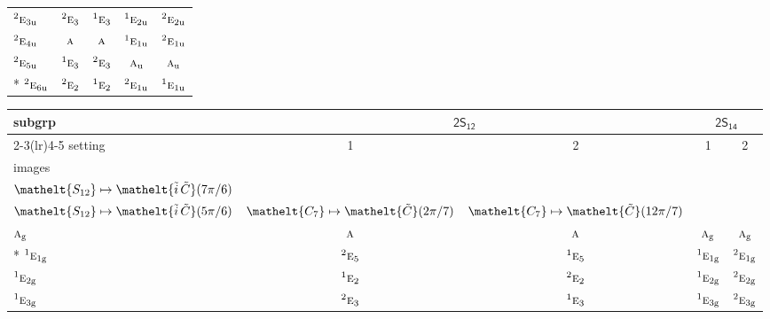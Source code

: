 \documentclass[10pt,a4paper]{article}
\numberwithin{equation}{section}
\newcommand{\eltfont}[1]{{\let\sigma\eltsigma\mathelt{#1}}}
\newcommand{\grp}[1]{\mathsf{#1}}
\newcommand{\irr}[1]{\text{\normalfont\scshape #1}}
\newcommand{\conjpair}[1]{{}^{#1}}
\newcommand{\cls}[1]{\eltfont{#1}}
\newcommand{\elt}[1]{\eltfont{#1}}
\newcommand{\ptag}[1]{\mathrm{#1}}
\newcommand{\lift}[1]{\tilde{#1}}
\begin{document}
{\begin{longtable}{@{}lcccc@{}}
$\conjpair{2}\irr{e}_{3\ptag{u}}$ & $\conjpair{2}\irr{e}_{3}$ & $\conjpair{1}\irr{e}_{3}$ & $\conjpair{1}\irr{e}_{2\ptag{u}}$ & $\conjpair{2}\irr{e}_{2\ptag{u}}$\\
$\conjpair{2}\irr{e}_{4\ptag{u}}$ & $\irr{a}$ & $\irr{a}$ & $\conjpair{1}\irr{e}_{1\ptag{u}}$ & $\conjpair{2}\irr{e}_{1\ptag{u}}$\\
$\conjpair{2}\irr{e}_{5\ptag{u}}$ & $\conjpair{1}\irr{e}_{3}$ & $\conjpair{2}\irr{e}_{3}$ & $\irr{a}_{\ptag{u}}$ & $\irr{a}_{\ptag{u}}$\\*
$\conjpair{2}\irr{e}_{6\ptag{u}}$ & $\conjpair{2}\irr{e}_{2}$ & $\conjpair{1}\irr{e}_{2}$ & $\conjpair{2}\irr{e}_{1\ptag{u}}$ & $\conjpair{1}\irr{e}_{1\ptag{u}}$\\
\bottomrule\end{longtable}}
{\small\begin{longtable}{@{}lcccc@{}}\toprule
subgrp & \multicolumn{2}{c}{\href{2S12.pdf}{$\grp{2S_{12}}$}} & \multicolumn{2}{c}{\href{2S14.pdf}{$\grp{2S_{14}}$}}\\\cmidrule(lr){2-3}\cmidrule(lr){4-5}
setting & 1 & 2 & 1 & 2\\
images & {\scriptsize\begin{tabular}[t]{@{}c@{}}$\cls{C_{6}} \mapsto \elt{\lift{C}}(\pi/3)$\\$\cls{S_{12}} \mapsto \elt{\lift{i}\,\lift{C}}(7\pi/6)$\end{tabular}} & {\scriptsize\begin{tabular}[t]{@{}c@{}}$\cls{C_{6}} \mapsto \elt{\lift{C}}(5\pi/3)$\\$\cls{S_{12}} \mapsto \elt{\lift{i}\,\lift{C}}(5\pi/6)$\end{tabular}} & {\scriptsize $\cls{C_{7}} \mapsto \elt{\lift{C}}(2\pi/7)$} & {\scriptsize $\cls{C_{7}} \mapsto \elt{\lift{C}}(12\pi/7)$}\\\midrule\endhead
\bottomrule\endfoot\endlastfoot
$\irr{a}_{\ptag{g}}$ & $\irr{a}$ & $\irr{a}$ & $\irr{a}_{\ptag{g}}$ & $\irr{a}_{\ptag{g}}$\\*
$\conjpair{1}\irr{e}_{1\ptag{g}}$ & $\conjpair{2}\irr{e}_{5}$ & $\conjpair{1}\irr{e}_{5}$ & $\conjpair{1}\irr{e}_{1\ptag{g}}$ & $\conjpair{2}\irr{e}_{1\ptag{g}}$\\
$\conjpair{1}\irr{e}_{2\ptag{g}}$ & $\conjpair{1}\irr{e}_{2}$ & $\conjpair{2}\irr{e}_{2}$ & $\conjpair{1}\irr{e}_{2\ptag{g}}$ & $\conjpair{2}\irr{e}_{2\ptag{g}}$\\
$\conjpair{1}\irr{e}_{3\ptag{g}}$ & $\conjpair{2}\irr{e}_{3}$ & $\conjpair{1}\irr{e}_{3}$ & $\conjpair{1}\irr{e}_{3\ptag{g}}$ & $\conjpair{2}\irr{e}_{3\ptag{g}}$\\

\end{longtable}}
\end{document}

